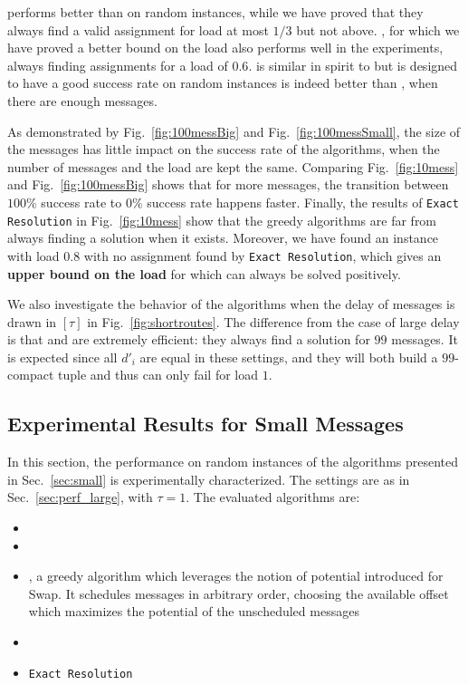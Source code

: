 \documentclass[pdflatex,sn-mathphys,iicol]{sn-jnl}%
\theoremstyle{thmstyleone}%
\theoremstyle{thmstyletwo}%
\theoremstyle{thmstylethree}%
\begin{document}
\firstfit performs better than \metaoffset on random instances, while we have proved that
they always find a valid assignment for load at most $1/3$ but not above.
 \compactpair, for which we have proved a better bound on the load also performs well in the experiments, always finding assignments for a load of $0.6$. \compactfit is similar in spirit to \compactpair but is designed to have a good success rate on random instances is indeed better than \compactpair, when there are enough messages.

As demonstrated by Fig.~\ref{fig:100messBig} and Fig.~\ref{fig:100messSmall}, the size of the messages has little impact on the success rate of the algorithms, when the number of messages and the load are kept the same. Comparing Fig.~\ref{fig:10mess} and Fig.~\ref{fig:100messBig} shows that for more messages, the transition between $100\%$ success rate to $0\%$ success rate happens faster.
Finally, the results of \texttt{Exact Resolution} in Fig.~\ref{fig:10mess} show that the greedy algorithms are far from always finding a solution when it exists. Moreover, we have found an instance with load $0.8$ with no assignment found by \texttt{Exact Resolution}, which gives an \textbf{upper bound on the load} for which \pma can always be solved positively.

We also investigate the behavior of the algorithms when the delay of messages is drawn in $[\tau]$ in Fig.~\ref{fig:shortroutes}. The difference from the case of large delay is that \compactpair and \compactfit are extremely efficient: they always find a solution for $99$ messages. It is expected since all $d'_i$ are equal in these settings, and they will both build a $99$-compact tuple and thus can only fail for load $1$.

\subsection{Experimental Results for Small Messages} \label{sec:perf_small}


In this section, the performance on random instances of the algorithms presented in Sec.~\ref{sec:small} is experimentally characterized. The settings are as in Sec.~\ref{sec:perf_large}, with $\tau = 1$. The evaluated algorithms are:

\begin{itemize}
  \item \firstfit
  \item \greedyuniform 
  \item \greedypotential, a greedy algorithm which leverages the notion of potential introduced for Swap. 
  It schedules messages in arbitrary order, choosing the available offset which maximizes the potential of the unscheduled messages
  \item \swapandmove 
  \item \texttt{Exact Resolution}
\end{itemize}
\end{document}
